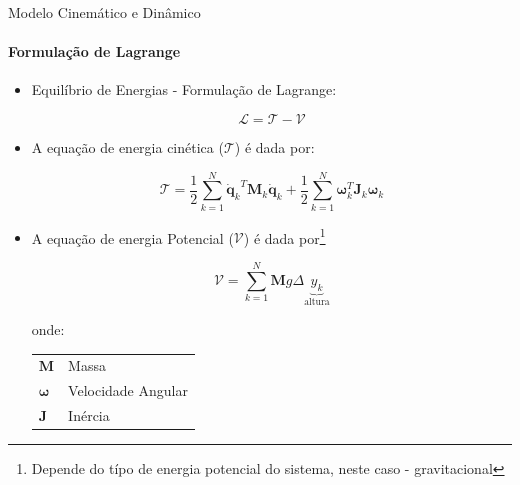 \documentclass{beamer}
\begin{document}
\begin{frame}{Modelo Cinemático e Dinâmico}
    \framesubtitle{Formulação de Lagrange}

    \begin{itemize}

        \item Equilíbrio de Energias - Formulação de Lagrange:

              \begin{equation}
                  \mathcal{L}= \mathcal{T} - \mathcal{V}
              \end{equation}

        \item A equação de energia cinética ($\mathcal{T}$) é dada por:

            \begin{equation}
                \mathcal{T} = \frac{1}{2} \sum\limits_{k=1}^{N}{\mathbf{\dot{q}}_k}^T  \mathbf{M}_k {\mathbf{\dot{q}}_k}+ \frac{1}{2} \sum\limits_{k=1}^{N}\mathbf{\omega}_k^T \mathbf{J}_k \mathbf{\omega}_k
            \end{equation}

        \item A equação de energia Potencial ($\mathcal{V}$) é dada por\footnote{Depende do típo de energia potencial do sistema, neste caso - gravitacional}

            \begin{equation}
                \mathcal{V} = \sum\limits_{k=1}^{N}\mathbf{M}g\Delta \underbrace{y_k}_{\text{altura}}
            \end{equation}  


              \begin{block}{}
                  \scriptsize{
                      onde:
                      \begin{tabular}{l|l}
                          $\mathbf{M}$               & Massa              \\
                          $\mathbf{\omega}$ & Velocidade Angular \\
                          $\mathbf{J}$               & Inércia         \\
                      \end{tabular}}
              \end{block}
    \end{itemize}
\end{frame}
\end{document}
